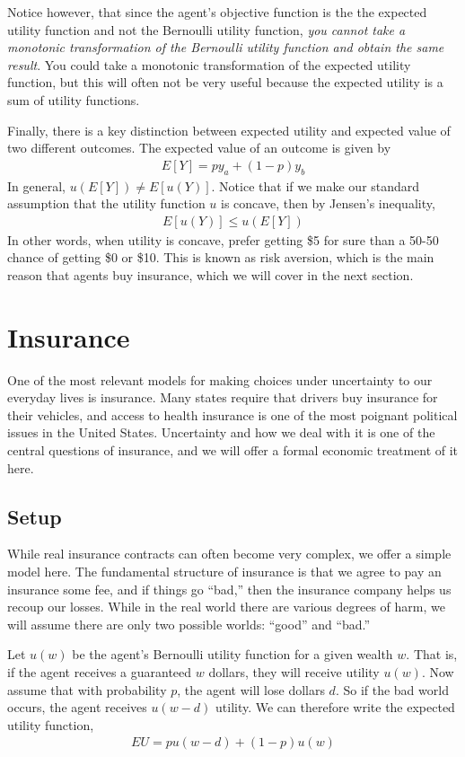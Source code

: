 Notice however, that since the agent's objective function is the the expected utility function and not the Bernoulli utility function, \emph{you cannot take a monotonic transformation of the Bernoulli utility function and obtain the same result}. You could take a monotonic transformation of the expected utility function, but this will often not be very useful because the expected utility is a sum of utility functions.

Finally, there is a key distinction between expected utility and expected value of two different outcomes. The expected value of an outcome is given by
\begin{align*}
    E[Y] = p y_a + (1 - p) y_b
\end{align*}
In general, $u(E[Y]) \neq E[u(Y)]$. Notice that if we make our standard assumption that the utility function $u$ is concave, then by Jensen's inequality,
\begin{align*}
    E[u(Y)] \leq u(E[Y])
\end{align*}
In other words, when utility is concave, prefer getting \$5 for sure than a 50-50 chance of getting \$0 or \$10. This is known as risk aversion, which is the main reason that agents buy insurance, which we will cover in the next section.

\section{Insurance}
One of the most relevant models for making choices under uncertainty to our everyday lives is insurance. Many states require that drivers buy insurance for their vehicles, and access to health insurance is one of the most poignant political issues in the United States. Uncertainty and how we deal with it is one of the central questions of insurance, and we will offer a formal economic treatment of it here. 

\subsection*{Setup}
While real insurance contracts can often become very complex, we offer a simple model here. The fundamental structure of insurance is that we agree to pay an insurance some fee, and if things go ``bad,'' then the insurance company helps us recoup our losses. While in the real world there are various degrees of harm, we will assume there are only two possible worlds: ``good'' and ``bad.''

Let $u(w)$ be the agent's Bernoulli utility function for a given wealth $w$. That is, if the agent receives a guaranteed $w$ dollars, they will receive utility $u(w)$. Now assume that with probability $p$, the agent will lose dollars $d$. So if the bad world occurs, the agent receives $u(w - d)$ utility. We can therefore write the expected utility function,
\begin{align*}
    EU = p u(w - d) + (1 - p)u(w)
\end{align*}

